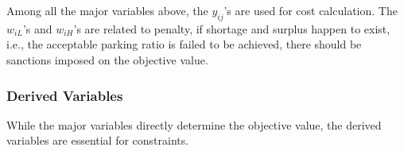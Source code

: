 \documentclass[a4paper, 12pt]{article}%
\theoremstyle{definition}
\begin{document}
\noindent Among all the major variables above, the $y_{ij}$'s are used for cost calculation. The $w_{iL}$'s and $w_{iH}$'s are related to penalty, if shortage and surplus happen to exist, i.e., the acceptable parking ratio is failed to be achieved, there should be sanctions imposed on the objective value.



\subsubsection{Derived Variables}
While the major variables directly determine the objective value, the derived variables are essential for constraints.

\newpage

\end{document}
